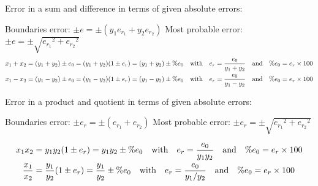 \documentclass{report}
\begin{document}
\begin{itemize}
	\ii Error in a sum and difference in terms of given absolute errors:
	\begin{itemize}
		\ii Boundaries error: $\pm e = \pm (y_1e_{r_1} + y_2e_{r_2})$
		\ii Most probable error: $\pm e = \pm \sqrt{{e_{r_1}}^2 + {e_{r_2}}^2}$
		\begin{align*}
			x_1 + x_2 & = (y_1 + y_2) \pm e_0 = (y_1 + y_2)(1\pm e_r) = (y_1 + y_2) \pm \% e_0 \qq{with} e_r = \frac{e_0}{y_1+y_2} \qand \% e_0 = e_r \times 100 \\
			x_1 - x_2 & = (y_1 - y_2) \pm e_0 = (y_1 - y_2)(1\pm e_r) = (y_1 - y_2) \pm \% e_0 \qq{with} e_r = \frac{e_0}{y_1-y_2} \qand \% e_0 = e_r \times 100
		\end{align*}
	\end{itemize}

	\ii Error in a product and quotient in terms of given absolute errors:
	\begin{itemize}
		\ii Boundaries error: $\pm e_r = \pm (e_{r_1} + e_{r_2})$
		\ii Most probable error: $\pm e_r = \pm \sqrt{{e_{r_1}}^2 + {e_{r_2}}^2}$

		\begin{align*}
			x_1x_2          & = y_1y_2(1\pm e_r) = y_1y_2 \pm \% e_0 \qq{with} e_r = \frac{e_0}{y_1y_2} \qand \% e_0 = e_r \times 100                    \\
			\frac{x_1}{x_2} & = \frac{y_1}{y_2}(1\pm e_r) = \frac{y_1}{y_2} \pm \% e_0 \qq{with} e_r = \frac{e_0}{y_1/y_2} \qand \% e_0 = e_r \times 100
		\end{align*}
	\end{itemize}
\end{itemize}
\end{document}
